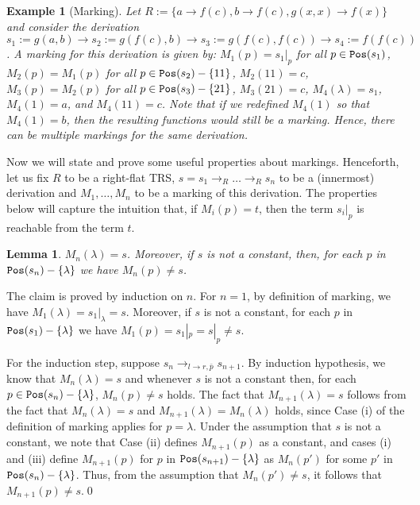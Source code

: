 \documentclass{LMCS}
\theoremstyle{plain}
\newtheorem{lemma}[thm]{Lemma}
\newtheorem{example}[thm]{Example}
\newcommand\Pos{{\tt Pos}}
\begin{document}
\begin{example}[Marking]
\label{example-marking}
Let $R := \{a\to f(c), b\to f(c), g(x,x)\to f(x)\}$ and consider
the derivation
$s_1 := g(a,b) \to s_2 := g(f(c),b) \to s_3 := g(f(c),f(c)) \to s_4 := f(f(c))$.
A marking for this derivation is given by:
$M_1(p) = s_1|_p$ for all $p\in\Pos(s_1)$,
$M_2(p) = M_1(p)$ for all $p\in\Pos(s_2)-\{11\}$,
$M_2(11) = c$,
$M_3(p) = M_2(p)$ for all $p\in\Pos(s_3)-\{21\}$,
$M_3(21) = c$, 
$M_4(\lambda) = s_1$,
$M_4(1) = a$, and
$M_4(11) = c$.
Note that if we redefined $M_4(1)$ so that
$M_4(1) = b$, then the resulting functions would still be a marking.
Hence, there can be multiple markings for the same derivation.
\end{example}




Now we will state and prove some useful properties about markings.
Henceforth, let us fix $R$ to be a right-flat TRS,
$s=s_1 \to_R\ldots\to_Rs_n$ to be a (innermost) derivation 
and
$M_1,\ldots,M_n$ to be a marking of this derivation.
The properties below will capture the intuition
that, if $M_i(p) = t$, then the term $s_i|_{p}$ 
is reachable from the term $t$.

\begin{lemma}\label{lemma-reach0}
$M_n(\lambda) = s$.
Moreover, if $s$ is not a constant, then,
for each $p$ in $\Pos(s_n)-\{\lambda\}$ we have $M_n(p)\neq s$.
\end{lemma}

\proof
The claim is proved by induction on $n$.
For $n=1$, by definition of marking, we have
$M_1(\lambda)=s_1|_\lambda=s$. Moreover, if $s$ is not a constant,
for each $p$ in ${\tt Pos}(s_1)-\{\lambda\}$ we have
$M_1(p)=s_1|_p=s|_p\not=s$.

For the induction step,
suppose $s_n \rightarrow_{l\rightarrow r,\bar{p}} s_{n+1}$.
By induction hypothesis, we know that $M_n(\lambda) = s$ and
whenever $s$ is not a constant then, for each $p\in{\tt Pos}(s_n)-\{\lambda\}$,
$M_n(p)\not=s$ holds.
The fact that $M_{n+1}(\lambda)=s$ follows from the fact
that $M_n(\lambda)=s$ and $M_{n+1}(\lambda)=M_n(\lambda)$
holds, since Case (i) of the definition of marking applies for
$p=\lambda$.
Under the assumption that $s$ is not a constant, we note
that Case (ii) defines $M_{n+1}(p)$ as a constant, and cases (i)
and (iii) define $M_{n+1}(p)$ for $p$ in ${\tt Pos}(s_{n+1})-\{\lambda\}$ as
$M_n(p')$ for some $p'$ in ${\tt Pos}(s_n)-\{\lambda\}$.
Thus, from the assumption
that $M_n(p')\not= s$, it follows that $M_{n+1}(p)\not= s$.\qed
\end{document}
